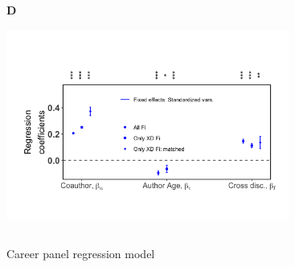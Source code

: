 \documentclass[10pt]{article}          %
\begin{document}
\begin{figure}[!htb]
  \endminipage\hfill
    \textbf{D}\\
    \includegraphics[width=9.3cm, height=7cm]{5B.png}
  \endminipage
  \caption{Career panel regression model}
  \label{fig:2A}
\end{figure}


\newpage
\end{document}
